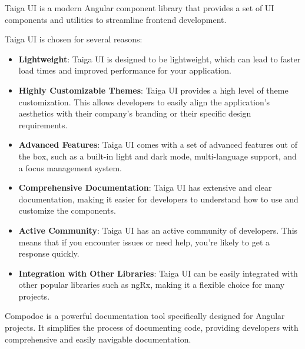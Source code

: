 
Taiga UI is a modern Angular component library that provides a set of UI components and utilities to streamline frontend development.

Taiga UI is chosen for several reasons:

\begin{itemize}
    \item \textbf{Lightweight}: Taiga UI is designed to be lightweight, which can lead to faster load times and improved performance for your application.
    \item \textbf{Highly Customizable Themes}: Taiga UI provides a high level of theme customization. This allows developers to easily align the application's aesthetics with their company's branding or their specific design requirements.
    \item \textbf{Advanced Features}: Taiga UI comes with a set of advanced features out of the box, such as a built-in light and dark mode, multi-language support, and a focus management system.
    \item \textbf{Comprehensive Documentation}: Taiga UI has extensive and clear documentation, making it easier for developers to understand how to use and customize the components.
    \item \textbf{Active Community}: Taiga UI has an active community of developers. This means that if you encounter issues or need help, you're likely to get a response quickly.
    \item \textbf{Integration with Other Libraries}: Taiga UI can be easily integrated with other popular libraries such as ngRx, making it a flexible choice for many projects.
\end{itemize}


Compodoc is a powerful documentation tool specifically designed for Angular projects. It simplifies the process of documenting code, providing developers with comprehensive and easily navigable documentation.

